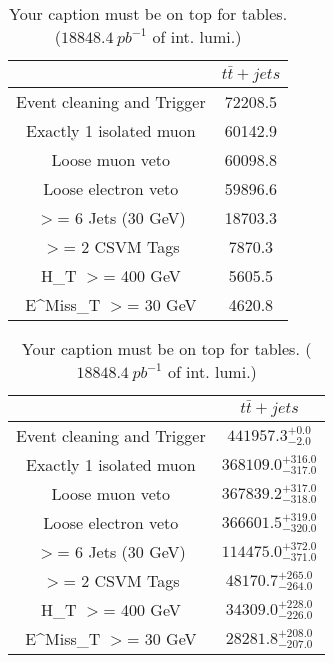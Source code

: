 \documentclass{article}
\begin{document}
\begin{table}
\caption{Your caption must be on top for tables. ($18848.4~pb^{-1}$ of int. lumi.)}
\label{tab:}
\centering
\begin{tabular}{|c|c|}
\toprule
&$t\bar{t}+jets$	\\

\midrule
Event cleaning and Trigger&	72208.5	\\

Exactly 1 isolated muon&	60142.9	\\

Loose muon veto&	60098.8	\\

Loose electron veto&	59896.6	\\

$>$= 6 Jets (30 GeV)&	18703.3	\\

$>$= 2 CSVM Tags&	7870.3	\\

H_{T} $>$=  400 GeV&	5605.5	\\

E^{Miss}_{T} $>$=  30 GeV&	4620.8	\\

\bottomrule
\end{tabular}
\end{table}
\begin{table}
\caption{Your caption must be on top for tables. ($18848.4~pb^{-1}$ of int. lumi.)}
\label{tab:}
\centering
\begin{tabular}{|c|c|}
\toprule
&$t\bar{t}+jets$	\\

\midrule
Event cleaning and Trigger&	$441957.3^{+0.0}_{-2.0}$	\\

Exactly 1 isolated muon&	$368109.0^{+316.0}_{-317.0}$	\\

Loose muon veto&	$367839.2^{+317.0}_{-318.0}$	\\

Loose electron veto&	$366601.5^{+319.0}_{-320.0}$	\\

$>$= 6 Jets (30 GeV)&	$114475.0^{+372.0}_{-371.0}$	\\

$>$= 2 CSVM Tags&	$48170.7^{+265.0}_{-264.0}$	\\

H_{T} $>$=  400 GeV&	$34309.0^{+228.0}_{-226.0}$	\\

E^{Miss}_{T} $>$=  30 GeV&	$28281.8^{+208.0}_{-207.0}$	\\

\bottomrule
\end{tabular}
\end{table}
\end{document}
